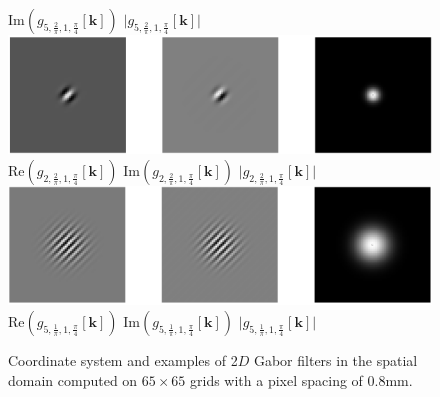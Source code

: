 \documentclass[fleqn,a4paper,oneside,openany]{book}
\begin{document}
\begin{figure}
\hspace{1.6cm}
$\text{Im}\left(g_{5,\frac{2}{\pi},1,\frac{\pi}{4}}[\boldsymbol{k}]\right)$
\hspace{1.8cm}
$\lvert g_{5,\frac{2}{\pi},1,\frac{\pi}{4}}[\boldsymbol{k}]\rvert$
%
\includegraphics[trim = 0 0 0 0, clip, scale=0.77]{Gabor3.png}\\
$\text{Re}\left(g_{2,\frac{2}{\pi},1,\frac{\pi}{4}}[\boldsymbol{k}]\right)$
\hspace{1.6cm}
$\text{Im}\left(g_{2,\frac{2}{\pi},1,\frac{\pi}{4}}[\boldsymbol{k}]\right)$
\hspace{1.8cm}
$\lvert g_{2,\frac{2}{\pi},1,\frac{\pi}{4}}[\boldsymbol{k}]\rvert$
%
\includegraphics[trim = 0 0 0 0, clip, scale=0.77]{Gabor4.png}\\
$\text{Re}\left(g_{5,\frac{1}{\pi},1,\frac{\pi}{4}}[\boldsymbol{k}]\right)$
\hspace{1.6cm}
$\text{Im}\left(g_{5,\frac{1}{\pi},1,\frac{\pi}{4}}[\boldsymbol{k}]\right)$
\hspace{1.8cm}
$\lvert g_{5,\frac{1}{\pi},1,\frac{\pi}{4}}[\boldsymbol{k}]\rvert$
\caption{Coordinate system and examples of 2$D$ Gabor filters in the spatial domain 
computed on $65\times 65$ grids with a pixel spacing of 0.8mm.}
  \label{fig:Gabor}
\end{figure}
%
\end{document}
